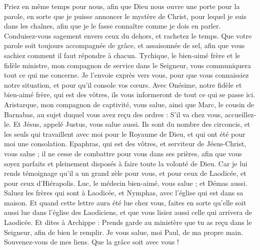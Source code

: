 \begin{multicols}{2}
Priez en même temps pour nous, afin que Dieu nous ouvre une porte pour la parole, en sorte que je puisse annoncer le mystère de Christ, pour lequel je suis dans les chaînes,
afin que je le fasse connaître comme je dois en parler.
Conduisez-vous sagement envers ceux du dehors, et rachetez le temps.
Que votre parole soit toujours accompagnée de grâce, et assaisonnée de sel, afin que vous sachiez comment il faut répondre à chacun.
Tychique, le bien-aimé frère et le fidèle ministre, mon compagnon de service dans le Seigneur, vous communiquera tout ce qui me concerne.
Je l’envoie exprès vers vous, pour que vous connaissiez notre situation, et pour qu’il console vos cœurs.
Avec Onésime, notre fidèle et bien-aimé frère, qui est des vôtres, ils vous informeront de tout ce qui se passe ici.
Aristarque, mon compagnon de captivité, vous salue, ainsi que Marc, le cousin de Barnabas, au sujet duquel vous avez reçu des ordres : S'il va chez vous, accueillez-le.
Et Jésus, appelé Justus, vous salue aussi. Ils sont du nombre des circoncis, et les seuls qui travaillent avec moi pour le Royaume de Dieu, et qui ont été pour moi une consolation.
Epaphras, qui est des vôtres, et serviteur de Jésus-Christ, vous salue ; il ne cesse de combattre pour vous dans ses prières, afin que vous soyez parfaits et pleinement disposés à faire toute la volonté de Dieu.
Car je lui rends témoignage qu'il a un grand zèle pour vous, et pour ceux de Laodicée, et pour ceux d'Hiérapolis.
Luc, le médecin bien-aimé, vous salue ; et Démas aussi.
Saluez les frères qui sont à Laodicée, et Nymphas, avec l'église qui est dans sa maison.
Et quand cette lettre aura été lue chez vous, faites en sorte qu'elle soit aussi lue dans l'église des Laodiciens, et que vous lisiez aussi celle qui arrivera de Laodicée.
Et dites à Archippe : Prends garde au ministère que tu as reçu dans le Seigneur, afin de bien le remplir.
Je vous salue, moi Paul, de ma propre main. Souvenez-vous de mes liens. Que la grâce soit avec vous !
\PPE{}
\end{multicols}
